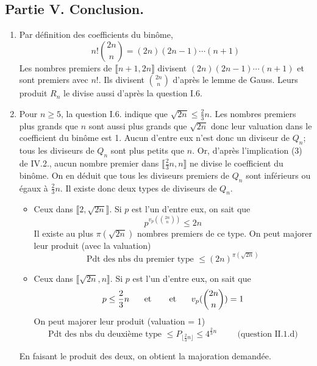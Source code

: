 \subsection*{Partie V. Conclusion.}
\begin{enumerate}
  \item Par définition des coefficients du binôme,
\begin{displaymath}
  n! \binom{2n}{n} = (2n)(2n-1)\cdots(n+1)
\end{displaymath}
Les nombres premiers de $\llbracket n+1, 2n \rrbracket$ divisent $(2n)(2n-1)\cdots(n+1)$ et sont premiers avec $n!$. Ils divisent $\binom{2n}{n}$ d'après le lemme de Gauss. Leurs produit $R_n$ le divise aussi d'après la question I.6.

  \item Pour $n\geq 5$, la question I.6. indique que $\sqrt{2n} \leq \frac{2}{3}n$. Les nombres premiers plus grands que $n$ sont aussi plus grands que $\sqrt{2n}$ donc leur valuation dans le coefficient du binôme est 1. Aucun d'entre eux n'est donc un diviseur de $Q_n$; tous les diviseurs de $Q_n$ sont plus petits que $n$. Or, d'après l'implication (3) de IV.2., aucun nombre premier dans $\llbracket \frac{2}{3}n,n\rrbracket$ ne divise le coefficient du binôme. On en déduit que tous les diviseurs premiers de $Q_n$ sont inférieurs ou égaux à $\frac{2}{3}n$.\newline
  Il existe donc deux types de diviseurs de $Q_n$.
\begin{itemize}
  \item Ceux dans $\llbracket 2, \sqrt{2n}\rrbracket$. Si $p$ est l'un d'entre eux, on sait que 
\begin{displaymath}
 p^{v_p(\binom{2n}{n})}\leq 2n
\end{displaymath}
Il existe au plus $\pi(\sqrt{2n})$ nombres premiers de ce type. On peut majorer leur produit (avec la valuation)
\begin{displaymath}
  \text{Pdt des nbs du premier type } \leq (2n)^{\pi(\sqrt{2n})}
\end{displaymath}


  \item Ceux dans $\llbracket \sqrt{2n}, n\rrbracket $. Si $p$ est l'un d'entre eux, on sait que 
\begin{displaymath}
    p\leq \frac{2}{3}n \hspace{0.5cm} \text{ et } \hspace{0.5cm} \text{ et } \hspace{0.5cm} v_p(\binom{2n}{n})=1
\end{displaymath}
On peut majorer leur produit (valuation = 1)
\begin{displaymath}
  \text{Pdt des nbs du deuxième type } \leq P_{\lfloor \frac{2}{3}n \rfloor} \leq 4^{\frac{2}{3}n}\hspace{1cm}\text{(question II.1.d)}
\end{displaymath}
\end{itemize}
En faisant le produit des deux, on obtient la majoration demandée.


\end{enumerate}

